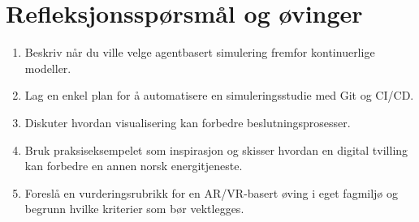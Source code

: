 \section{Refleksjonsspørsmål og øvinger}
\begin{enumerate}
    \item Beskriv når du ville velge agentbasert simulering fremfor kontinuerlige modeller.
    \item Lag en enkel plan for å automatisere en simuleringsstudie med Git og CI/CD.
    \item Diskuter hvordan visualisering kan forbedre beslutningsprosesser.
    \item Bruk praksiseksempelet som inspirasjon og skisser hvordan en digital tvilling kan forbedre en annen norsk energitjeneste.
    \item Foreslå en vurderingsrubrikk for en AR/VR-basert øving i eget fagmiljø og begrunn hvilke kriterier som bør vektlegges.
\end{enumerate}
